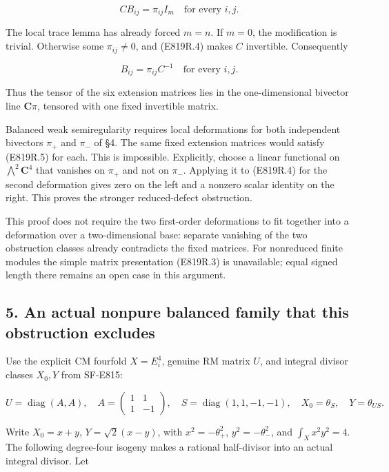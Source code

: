 \[
 C B_{ij}=\pi_{ij} I_m\quad\text{for every }i,j.
 \tag{E819R.4}
\]

The local trace lemma has already forced \(m=n\). If \(m=0\), the
modification is trivial. Otherwise some \(\pi_{ij}\ne0\), and (E819R.4)
makes \(C\) invertible. Consequently

\[
 B_{ij}=\pi_{ij}C^{-1}\quad\text{for every }i,j.
 \tag{E819R.5}
\]

Thus the tensor of the six extension matrices lies in the
one-dimensional bivector line \(\mathbf C\pi\), tensored with one fixed
invertible matrix.

Balanced weak semiregularity requires local deformations for both
independent bivectors \(\pi_+\) and \(\pi_-\) of §4. The same fixed
extension matrices would satisfy (E819R.5) for each. This is impossible.
Explicitly, choose a linear functional on \(\bigwedge^2\mathbf C^4\)
that vanishes on \(\pi_+\) and not on \(\pi_-\). Applying it to
(E819R.4) for the second deformation gives zero on the left and a
nonzero scalar identity on the right. This proves the stronger
reduced-defect obstruction.

This proof does not require the two first-order deformations to fit
together into a deformation over a two-dimensional base: separate
vanishing of the two obstruction classes already contradicts the fixed
matrices. For nonreduced finite modules the simple matrix presentation
(E819R.3) is unavailable; equal signed length there remains an open case
in this argument.

\subsection{5. An actual nonpure balanced family that this obstruction
excludes}\label{SF-E819-an-actual-nonpure-balanced-family-that-this-obstruction-excludes}

Use the explicit CM fourfold \(X=E_i^4\), genuine RM matrix \(U\), and
integral divisor classes \(X_0,Y\) from SF-E815:

\[
 U=\operatorname{diag}(A,A),\quad
 A=\begin{pmatrix}1&1\\1&-1\end{pmatrix},\quad
 S=\operatorname{diag}(1,1,-1,-1),\quad
 X_0=\theta_S,\quad Y=\theta_{US}.
\]

Write \(X_0=x+y\), \(Y=\sqrt2(x-y)\), with \(x^2=-\theta_+^2\),
\(y^2=-\theta_-^2\), and \(\int_Xx^2y^2=4\). The following degree-four
isogeny makes a rational half-divisor into an actual integral divisor.
Let

